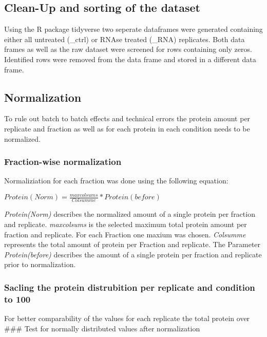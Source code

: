 \documentclass[
]{article}
\begin{document}
\hypertarget{clean-up-and-sorting-of-the-dataset}{%
\subsection{Clean-Up and sorting of the
dataset}\label{clean-up-and-sorting-of-the-dataset}}

Using the R package tidyverse two seperate dataframes were generated
containing either all untreated (\_ctrl) or RNAse treated (\_RNA)
replicates. Both data frames as well as the raw dataset were screened
for rows containing only zeros. Identified rows were removed from the
data frame and stored in a different data frame.

\hypertarget{normalization}{%
\subsection{Normalization}\label{normalization}}

To rule out batch to batch effects and technical errors the protein
amount per replicate and fraction as well as for each protein in each
condition needs to be normalized.

\hypertarget{fraction-wise-normalization}{%
\subsubsection{Fraction-wise
normalization}\label{fraction-wise-normalization}}

Normaliziation for each fraction was done using the following equation:

\(Protein(Norm) = \frac{maxcolsums}{Colsumme} * Protein(before)\)

\emph{Protein(Norm)} describes the normalized amount of a single protein
per fraction and replicate. \emph{maxcolsums} is the selected maximum
total protein amount per fraction and replicate. For each Fraction one
maxium was chosen. \emph{Colsumme} represents the total amount of
protein per Fraction and replicate. The Parameter \emph{Protein(before)}
describes the amount of a single protein per fraction and replicate
prior to normalization.

\hypertarget{sacling-the-protein-distrubition-per-replicate-and-condition-to-100}{%
\subsubsection{Sacling the protein distrubition per replicate and
condition to
100}\label{sacling-the-protein-distrubition-per-replicate-and-condition-to-100}}

For better comparability of the values for each replicate the total
protein over\\
\#\#\# Test for normally distributed values after normalization
\end{document}

